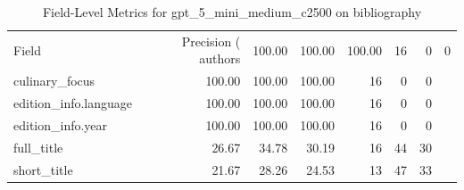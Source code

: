 \begin{table}
\caption{Field-Level Metrics for gpt_5_mini_medium_c2500 on bibliography}
\label{tab:fields_gpt_5_mini_medium_c2500_bibliography}
\begin{tabular}{lrrrrrr}
\toprule
Field & Precision (%
\midrule
authors & 100.00 & 100.00 & 100.00 & 16 & 0 & 0 \\
culinary_focus & 100.00 & 100.00 & 100.00 & 16 & 0 & 0 \\
edition_info.language & 100.00 & 100.00 & 100.00 & 16 & 0 & 0 \\
edition_info.year & 100.00 & 100.00 & 100.00 & 16 & 0 & 0 \\
full_title & 26.67 & 34.78 & 30.19 & 16 & 44 & 30 \\
short_title & 21.67 & 28.26 & 24.53 & 13 & 47 & 33 \\
\bottomrule
\end{tabular}
\end{table}

